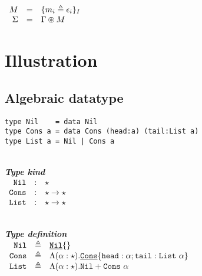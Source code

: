 \documentclass{article}[11pt]
\newcommand{\subsubsubsection}[1]
{
    ~\\
    {\bf {\em #1}} \\
}
\newcommand{\term}[1]{\verb~#1~}
\newcommand{\cons}[1]{\underline{\verb~#1~}}
\begin{document}
    \begin{math}
        \begin{array}{rclp{5cm}}
            M                & = & \{ m_i \triangleq \epsilon_i \}_I                          \\
            \Sigma           & = & \Gamma \circledast M                                       \\
        \end{array}
    \end{math}


    \section{Illustration}\label{sec:illustration}

    \subsection{Algebraic datatype}\label{subsec:algebraic-datatype}

    \begin{verbatim}
type Nil    = data Nil
type Cons a = data Cons (head:a) (tail:List a)
type List a = Nil | Cons a
    \end{verbatim}

    \subsubsubsection{Type kind}

    \noindent
    \begin{math}
        \begin{array}{rclp{5cm}}
            \term{Nil}  & : & \star                   \\
            \term{Cons} & : & \star \rightarrow \star \\
            \term{List} & : & \star \rightarrow \star
        \end{array}
    \end{math}

    \subsubsubsection{Type definition}

    \noindent
    \begin{math}
        \begin{array}{rclp{5cm}}
            \term{Nil}  & \triangleq & \cons{Nil}\{\}                                                                                \\
            \term{Cons} & \triangleq & \Lambda(\alpha:\star).\cons{Cons}\{ \term{head} :\alpha; \term{tail} : \term{List} ~\alpha \} \\
            \term{List} & \triangleq & \Lambda(\alpha:\star).\term{Nil} + \term{Cons} ~ \alpha
        \end{array}
    \end{math}
\end{document}

